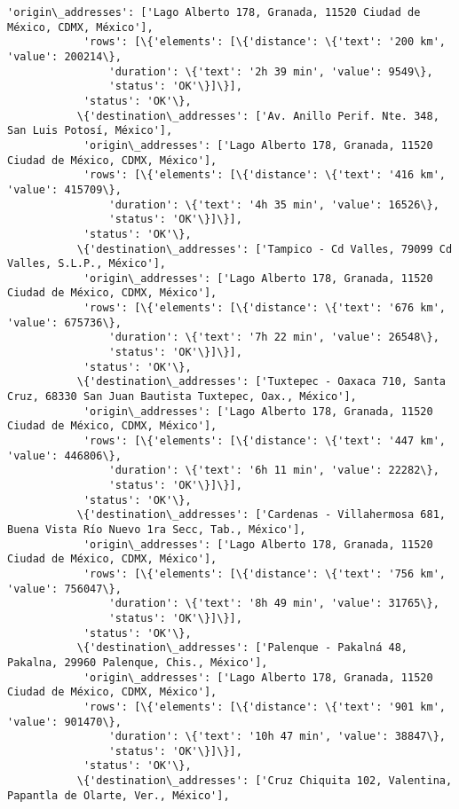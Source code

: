 \documentclass[11pt]{article}
\begin{document}
\begin{Verbatim}[commandchars=\\\{\}]
            'origin\_addresses': ['Lago Alberto 178, Granada, 11520 Ciudad de México, CDMX, México'],
            'rows': [\{'elements': [\{'distance': \{'text': '200 km', 'value': 200214\},
                'duration': \{'text': '2h 39 min', 'value': 9549\},
                'status': 'OK'\}]\}],
            'status': 'OK'\},
           \{'destination\_addresses': ['Av. Anillo Perif. Nte. 348, San Luis Potosí, México'],
            'origin\_addresses': ['Lago Alberto 178, Granada, 11520 Ciudad de México, CDMX, México'],
            'rows': [\{'elements': [\{'distance': \{'text': '416 km', 'value': 415709\},
                'duration': \{'text': '4h 35 min', 'value': 16526\},
                'status': 'OK'\}]\}],
            'status': 'OK'\},
           \{'destination\_addresses': ['Tampico - Cd Valles, 79099 Cd Valles, S.L.P., México'],
            'origin\_addresses': ['Lago Alberto 178, Granada, 11520 Ciudad de México, CDMX, México'],
            'rows': [\{'elements': [\{'distance': \{'text': '676 km', 'value': 675736\},
                'duration': \{'text': '7h 22 min', 'value': 26548\},
                'status': 'OK'\}]\}],
            'status': 'OK'\},
           \{'destination\_addresses': ['Tuxtepec - Oaxaca 710, Santa Cruz, 68330 San Juan Bautista Tuxtepec, Oax., México'],
            'origin\_addresses': ['Lago Alberto 178, Granada, 11520 Ciudad de México, CDMX, México'],
            'rows': [\{'elements': [\{'distance': \{'text': '447 km', 'value': 446806\},
                'duration': \{'text': '6h 11 min', 'value': 22282\},
                'status': 'OK'\}]\}],
            'status': 'OK'\},
           \{'destination\_addresses': ['Cardenas - Villahermosa 681, Buena Vista Río Nuevo 1ra Secc, Tab., México'],
            'origin\_addresses': ['Lago Alberto 178, Granada, 11520 Ciudad de México, CDMX, México'],
            'rows': [\{'elements': [\{'distance': \{'text': '756 km', 'value': 756047\},
                'duration': \{'text': '8h 49 min', 'value': 31765\},
                'status': 'OK'\}]\}],
            'status': 'OK'\},
           \{'destination\_addresses': ['Palenque - Pakalná 48, Pakalna, 29960 Palenque, Chis., México'],
            'origin\_addresses': ['Lago Alberto 178, Granada, 11520 Ciudad de México, CDMX, México'],
            'rows': [\{'elements': [\{'distance': \{'text': '901 km', 'value': 901470\},
                'duration': \{'text': '10h 47 min', 'value': 38847\},
                'status': 'OK'\}]\}],
            'status': 'OK'\},
           \{'destination\_addresses': ['Cruz Chiquita 102, Valentina, Papantla de Olarte, Ver., México'],

\end{Verbatim}
\end{document}
